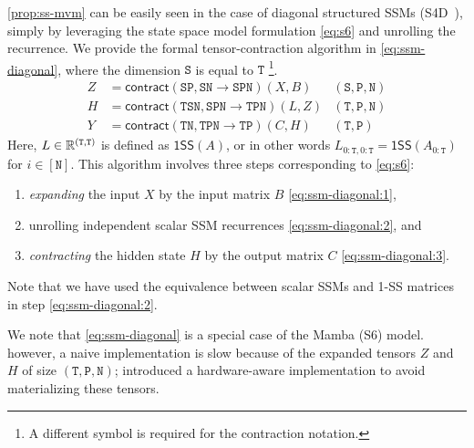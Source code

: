 \cref{prop:ss-mvm} can be easily seen in the case of diagonal structured SSMs (S4D~\citep{gu2022parameterization}),
simply by leveraging the state space model formulation \eqref{eq:s6} and unrolling the recurrence.
We provide the formal tensor-contraction algorithm in \eqref{eq:ssm-diagonal}, where the dimension $\mathtt{S}$ is equal to $\mathtt{T}$%
\footnote{A different symbol is required for the contraction notation.}.
\begin{subequations}
  \label{eq:ssm-diagonal}
  \begin{align}
    \label{eq:ssm-diagonal:1}
    Z &= \mathsf{contract}(\mathtt{SP},\mathtt{SN} \to \mathtt{SPN})(X, B) & \mathtt{(S,P,N)} \\
    \label{eq:ssm-diagonal:2}
    H &= \mathsf{contract}(\mathtt{TSN},\mathtt{SPN} \to \mathtt{TPN})(L, Z) & \mathtt{(T,P,N)} \\
    \label{eq:ssm-diagonal:3}
    Y &= \mathsf{contract}(\mathtt{TN},\mathtt{TPN} \to \mathtt{TP})(C, H) & \mathtt{(T,P)}
  \end{align}
\end{subequations}
Here, $L \in \mathbb{R}^{(\mathtt{T},\mathtt{T})}$ is defined as $\mathsf{1SS}(A)$, or in other words $L_{0:\mathtt{T},0:\mathtt{T}} = \mathsf{1SS}(A_{0:\mathtt{T}})$ for $i \in [\mathtt{N}]$.
This algorithm involves three steps corresponding to \eqref{eq:s6}:
\begin{enumerate}[label=(\roman*)]
  \item \emph{expanding} the input $X$ by the input matrix $B$ \eqref{eq:ssm-diagonal:1},
  \item unrolling independent scalar SSM recurrences \eqref{eq:ssm-diagonal:2}, and
  \item \emph{contracting} the hidden state $H$ by the output matrix $C$ \eqref{eq:ssm-diagonal:3}.
\end{enumerate}
Note that we have used the equivalence between scalar SSMs and 1-SS matrices in step \eqref{eq:ssm-diagonal:2}.

\begin{remark}
  We note that \eqref{eq:ssm-diagonal} is a special case of the Mamba (S6) model.
  however, a naive implementation is slow because of the expanded tensors $Z$ and $H$ of size $\mathtt{(T,P,N)}$;
  \citet{gu2023mamba} introduced a hardware-aware implementation to avoid materializing these tensors.
\end{remark}



